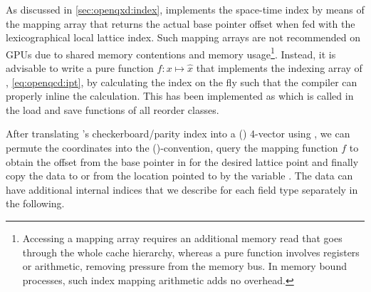 

As discussed in \cref{sec:openqxd:index}, \openqxd implements the space-time index by means of the mapping array  that returns the actual base pointer offset when fed with the lexicographical local lattice index.
Such mapping arrays are not recommended on GPUs due to shared memory contentions and memory usage\footnote{
Accessing a mapping array requires an additional memory read that goes through the whole cache hierarchy, whereas a pure function involves registers or arithmetic, removing pressure from the memory bus.
In memory bound processes, such index mapping arithmetic adds no overhead.
}.
Instead, it is advisable to write a pure function $f \colon x \mapsto \hat{x}$ that implements the indexing array of \openqxd, \cref{eq:openqcd:ipt}, by calculating the index on the fly such that the compiler can properly inline the calculation.
This has been implemented as  which is called in the load and save functions of all reorder classes.




After translating \quda's checkerboard/parity index into a (\xyzt) 4-vector using , we can permute the coordinates into the (\txyz)-convention, query the mapping function $f$ to obtain the offset from the base pointer in \openqxd for the desired lattice point and finally copy the data to or from the location pointed to by the variable .
The data can have additional internal indices that we describe for each field type separately in the following.

